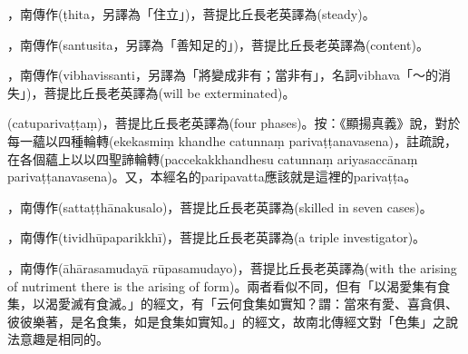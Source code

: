 \startitemgroup[noteitems]
\item{}，南傳作(ṭhita，另譯為「住立」)，菩提比丘長老英譯為(steady)。
\stopitemgroup

\startitemgroup[noteitems]
\item{}，南傳作(santusita，另譯為「善知足的」)，菩提比丘長老英譯為(content)。
\stopitemgroup

\startitemgroup[noteitems]
\item{}，南傳作(vibhavissanti，另譯為「將變成非有；當非有」，名詞vibhava「～的消失」)，菩提比丘長老英譯為(will be exterminated)。
\stopitemgroup

\startitemgroup[noteitems]
\item{}(catuparivaṭṭaṃ)，菩提比丘長老英譯為(four phases)。按：《顯揚真義》說，對於每一蘊以四種輪轉(ekekasmiṃ khandhe catunnaṃ parivaṭṭanavasena)，註疏說，在各個蘊上以以四聖諦輪轉(paccekakkhandhesu catunnaṃ ariyasaccānaṃ parivaṭṭanavasena)。又，本經名的paripavatta應該就是這裡的parivaṭṭa。
\stopitemgroup

\startitemgroup[noteitems]
\item{}，南傳作(sattaṭṭhānakusalo)，菩提比丘長老英譯為(skilled in seven cases)。
\stopitemgroup

\startitemgroup[noteitems]
\item{}，南傳作(tividhūpaparikkhī)，菩提比丘長老英譯為(a triple investigator)。
\stopitemgroup

\startitemgroup[noteitems]
\item{}，南傳作(āhārasamudayā rūpasamudayo)，菩提比丘長老英譯為(with the arising of nutriment there is the arising of form)。兩者看似不同，但有「以渴愛集有食集，以渴愛滅有食滅。」的經文，有「云何食集如實知？謂：當來有愛、喜貪俱、彼彼樂著，是名食集，如是食集如實知。」的經文，故南北傳經文對「色集」之說法意趣是相同的。
\stopitemgroup

